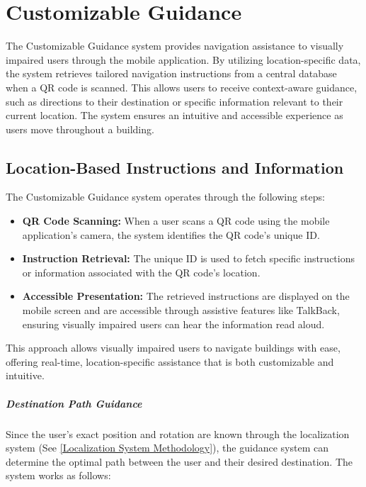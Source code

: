 \section{Customizable Guidance}
\label{Customizable Guidance Methodology Section}

The Customizable Guidance system provides navigation assistance to visually impaired users through the mobile application. By utilizing location-specific data, the system retrieves tailored navigation instructions from a central database when a QR code is scanned. This allows users to receive context-aware guidance, such as directions to their destination or specific information relevant to their current location. The system ensures an intuitive and accessible experience as users move throughout a building.

\subsection{Location-Based Instructions and Information}

The Customizable Guidance system operates through the following steps:

\begin{itemize}
	\item \textbf{QR Code Scanning:} When a user scans a QR code using the mobile application's camera, the system identifies the QR code's unique ID.
	\item \textbf{Instruction Retrieval:} The unique ID is used to fetch specific instructions or information associated with the QR code's location.
	\item \textbf{Accessible Presentation:} The retrieved instructions are displayed on the mobile screen and are accessible through assistive features like TalkBack, ensuring visually impaired users can hear the information read aloud.
\end{itemize}

This approach allows visually impaired users to navigate buildings with ease, offering real-time, location-specific assistance that is both customizable and intuitive.


\subparagraph{Destination Path Guidance}

Since the user's exact position and rotation are known through the localization system (See \ref{Localization System Methodology}), the guidance system can determine the optimal path between the user and their desired destination. The system works as follows:

